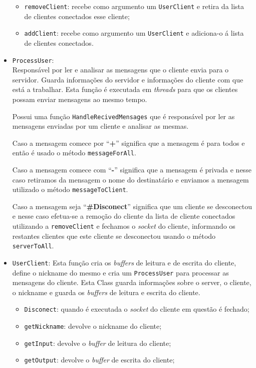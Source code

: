 \documentclass{article}
\begin{document}
\begin{itemize}
\begin{itemize}
        \item \verb|removeClient|: recebe como argumento um \verb|UserClient| e retira da lista de clientes conectados esse cliente;
        \item \verb|addClient|: recebe como argumento um \verb|UserClient| e adiciona-o á lista de clientes conectados.
    \end{itemize}
    \newpage
    \item \verb|ProcessUser|: \\
    Responsável por ler e analisar as mensagens que o cliente envia para o servidor.
Guarda informações do servidor e informações do cliente com que está a trabalhar. Esta função é executada em \emph{threads} para que os clientes possam enviar mensagens ao mesmo tempo.

Possui uma função \verb|HandleRecivedMensages| que é responsável por ler as mensagens enviadas por um cliente e analisar as mesmas.

Caso a mensagem comece por “\textbf{+}” significa que a mensagem é para todos e então é usado o método \verb|messageForAll|.

Caso a mensagem comece com “\textbf{-}” significa que a mensagem é privada e nesse caso retiramos da mensagem o nome do destinatário e enviamos a mensagem utilizado o método \verb|messageToClient|.

Caso a mensagem seja “\textbf{#Disconect}” significa que um cliente se desconectou e nesse caso efetua-se a remoção do cliente da lista de cliente conectados utilizando a \verb|removeClient| e fechamos o \emph{socket} do cliente, informando os restantes clientes que este cliente se desconectou usando o método \verb|serverToAll|.

    \item \verb|UserClient|:
    Esta função cria os \emph{buffers} de leitura e de escrita do cliente, define o nickname do mesmo e cria um \verb|ProcessUser| para processar as mensagens do cliente.
Esta Class guarda informações sobre o server, o cliente, o nickname e guarda os \emph{buffers} de leitura e escrita do cliente.
\begin{itemize}
    \item \verb|Disconect|: quando é executada o \emph{socket} do cliente em questão é fechado; 
    \item \verb|getNickname|: devolve o nickname do cliente;
    \item \verb|getInput|: devolve o \emph{buffer} de leitura do cliente;
    \item \verb|getOutput|: devolve o \emph{buffer} de escrita do cliente;
\end{itemize}
\end{itemize}
\end{document}

